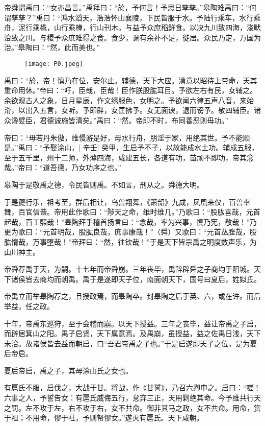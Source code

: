 \documentclass[UTF8,12pt,AutoFakeBold]{ctexart}
\begin{document}
	帝舜谓禹曰：“女亦昌言。”禹拜曰：“於，予何言！予思日孳孳。”皋陶难禹曰：“何谓孳孳？”禹曰：“鸿水滔天，浩浩怀山襄陵，下民皆服于水。予陆行乘车，水行乘舟，泥行乘橇，山行乘檋，行山刊木。与益予众庶稻鲜食。以决九川致四海，浚畎浍致之川。与稷予众庶难得之食。食少，调有余补不足，徙居。众民乃定，万国为治。”皋陶曰：“然，此而美也。”
	\begin{figure}[htbp]
		\centering
		\texttt{[image: P0.jpeg]}
		\captionsetup{font=footnotesize}
		\label{图：CV}
	\end{figure}
	禹曰：“於，帝！慎乃在位，安尔止。辅德，天下大应。清意以昭待上帝命，天其重命用休。”帝曰：“吁，臣哉，臣哉！臣作朕股肱耳目。予欲左右有民，女辅之。余欲观古人之象，日月星辰，作文绣服色，女明之。予欲闻六律五声八音，来始滑，以出入五言，女听。予即辟，女匡拂予。女无面谀，退而谤予。敬四辅臣。诸众谗嬖臣，君德诚施皆清矣。”禹曰：“然。帝即不时，布同善恶则毋功。”
	
	帝曰：“毋若丹朱傲，维慢游是好，毋水行舟，朋淫于家，用绝其世。予不能顺是。”禹曰：“予娶涂山，[ 辛壬] 癸甲，生启予不子，以故能成水土功。辅成五服，至于五千里，州十二师，外薄四海，咸建五长，各道有功，苗顽不即功，帝其念哉。”帝曰：“道吾德，乃女功序之也。”
	
	皋陶于是敬禹之德，令民皆则禹。不如言，刑从之。舜德大明。
	
	于是夔行乐，祖考至，群后相让，鸟兽翔舞，《箫韶》九成，凤凰来仪，百兽率舞，百官信谐。帝用此作歌曰：“陟天之命，维时维几。”乃歌曰：“股肱喜哉，元首起哉，百工熙哉！”皋陶拜手稽首扬言曰：“念哉，率为兴事，慎乃宪，敬哉！”乃更为歌曰：“元首明哉，股肱良哉，庶事康哉！”（舜）又歌曰：“元首丛脞哉，股肱惰哉，万事堕哉！”帝拜曰：“然，往钦哉！”于是天下皆宗禹之明度数声乐，为山川神主。
	
	帝舜荐禹于天，为嗣。十七年而帝舜崩。三年丧毕，禹辞辟舜之子商均于阳城。天下诸侯皆去商均而朝禹。禹于是遂即天子位，南面朝天下，国号曰夏后，姓姒氏。
	
	帝禹立而举皋陶荐之，且授政焉，而皋陶卒。封皋陶之后于英、六，或在许。而后举益，任之政。
	
	十年，帝禹东巡狩，至于会稽而崩。以天下授益。三年之丧毕，益让帝禹之子启，而辟居箕山之阳。禹子启贤，天下属意焉。及禹崩，虽授益，益之佐禹日浅，天下未洽。故诸侯皆去益而朝启，曰“吾君帝禹之子也。”于是启遂即天子之位，是为夏后帝启。
	
	夏后帝启，禹之子，其母涂山氏之女也。
	
	有扈氏不服，启伐之，大战于甘。将战，作《甘誓》，乃召六卿申之。启曰：“嗟！六事之人，予誓告女：有扈氏威侮五行，怠弃三正，天用剿绝其命。今予维共行天之罚。左不攻于左，右不攻于右，女不共命。御非其马之政，女不共命。用命，赏于祖；不用命，僇于社，予则帑僇女。”遂灭有扈氏。天下咸朝。
	
\end{document}
